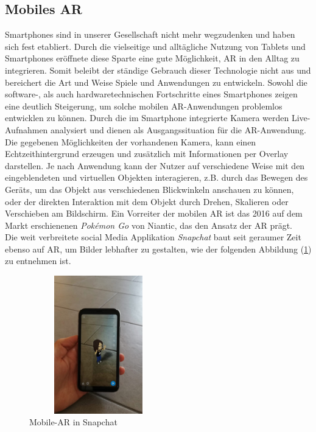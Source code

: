 \subsection*{Mobiles AR}
\label{sec:mobilesAR}
Smartphones sind in unserer Gesellschaft nicht mehr wegzudenken und haben sich fest etabliert. Durch die vielseitige und alltägliche Nutzung 
von Tablets und Smartphones eröffnete diese Sparte eine gute Möglichkeit, \acl{AR} in den Alltag zu integrieren. Somit beleibt der ständige 
Gebrauch dieser Technologie nicht aus und bereichert die Art und Weise Spiele und Anwendungen zu entwickeln.
Sowohl die software-, als auch hardwaretechnischen Fortschritte eines Smartphones zeigen eine deutlich Steigerung, um solche mobilen 
\acs{AR}-Anwendungen problemlos entwicklen zu können.
Durch die im Smartphone integrierte Kamera werden Live-Aufnahmen analysiert und dienen als Ausgangssituation für die \acs{AR}-Anwendung. 
Die gegebenen Möglichkeiten der vorhandenen Kamera, kann einen Echtzeithintergrund erzeugen und zusätzlich mit Informationen per Overlay darstellen. 
Je nach Anwendung kann der Nutzer auf verschiedene Weise mit den eingeblendeten und virtuellen Objekten interagieren, z.B. durch das 
Bewegen des Geräts, um das Objekt aus verschiedenen Blickwinkeln anschauen zu können, oder der direkten Interaktion mit dem Objekt durch 
Drehen, Skalieren oder Verschieben am Bildschirm. Ein Vorreiter der mobilen AR ist das 2016 auf dem Markt erschienenen \textit{Pokémon Go} 
von Niantic, das den Ansatz der \acs{AR} prägt. \cite{pokemongo.2016a}
\\ 
\linebreak
Die weit verbreitete social Media Applikation \textit{Snapchat} baut seit geraumer Zeit ebenso auf \acl{AR}, um Bilder lebhafter zu 
gestalten, wie der folgenden Abbildung (\ref{pic:snapchatAR}) zu entnehmen ist. 
\begin{figure}[hbt!]
    \centering
    \includegraphics[width=6cm,height=6cm,keepaspectratio]{2Grundlagen/Bilder/snapchatAR.jpeg}
    \caption{Mobile-AR in Snapchat}
    \label{pic:snapchatAR}
\end{figure}
\pagebreak
